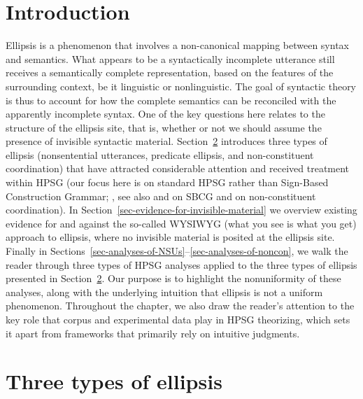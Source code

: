 {


\section{Introduction}
\label{ellipsis-sec-introduction}

Ellipsis is a phenomenon that involves a non-canonical mapping between syntax and semantics. What appears to be a syntactically incomplete utterance still receives a semantically complete representation, based on the features of the surrounding context, be it linguistic or nonlinguistic. The goal of syntactic theory is thus to account for how the complete semantics can be reconciled with the apparently incomplete syntax. One of the key questions here relates to the structure of the ellipsis site, that is, whether or not we should assume the presence of invisible syntactic material. Section~\ref{sec-three-types-of-ellipsis} introduces three types of ellipsis (nonsentential utterances, predicate ellipsis, and non-constituent coordination) that have attracted considerable attention and received treatment within HPSG (our focus here is on standard HPSG rather than Sign-Based Construction Grammar; \citealt{Sag2012}, see also  and  on SBCG and  on non-constituent coordination). 
 In Section~\ref{sec-evidence-for-invisible-material} we overview existing evidence for and against the so-called WYSIWYG (what you see is what you get) approach to ellipsis, where no invisible material is posited at the ellipsis site. Finally in Sections~\ref{sec-analyses-of-NSUs}--\ref{sec-analyses-of-noncon}, we walk the reader through three types of HPSG analyses applied to the three types of ellipsis presented in Section~\ref{sec-three-types-of-ellipsis}. Our purpose is to highlight the nonuniformity of these analyses, along with the underlying intuition that ellipsis is not a uniform phenomenon. Throughout the chapter, we also draw the reader's attention to the key role that corpus and experimental data play in HPSG theorizing, which sets it apart from frameworks that primarily rely on intuitive judgments.




\section{Three types of ellipsis}
\label{sec-three-types-of-ellipsis}

}
